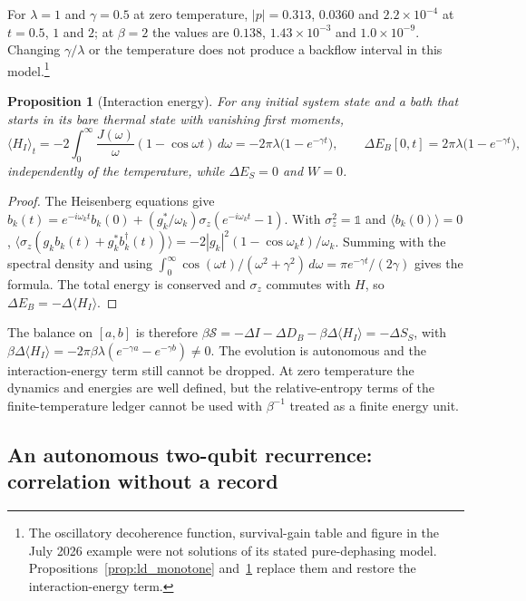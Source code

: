 \documentclass[12pt]{article}
\newtheorem{proposition}[theorem]{Proposition}
\begin{document}
For $\lambda=1$ and $\gamma=0.5$ at zero temperature, $|p|=0.313$, $0.0360$ and $2.2\times10^{-4}$ at $t=0.5$, $1$ and $2$; at $\beta=2$ the values are $0.138$, $1.43\times10^{-3}$ and $1.0\times10^{-9}$. Changing $\gamma/\lambda$ or the temperature does not produce a backflow interval in this model.\footnote{The oscillatory decoherence function, survival-gain table and figure in the July 2026 example were not solutions of its stated pure-dephasing model. Propositions~\ref{prop:ld_monotone} and~\ref{prop:ld_energy} replace them and restore the interaction-energy term.}

\begin{proposition}[Interaction energy]
\label{prop:ld_energy}
For any initial system state and a bath that starts in its bare thermal state with vanishing first moments,
\[
\langle H_I\rangle_t=-2\int_0^\infty\frac{J(\omega)}\omega(1-\cos\omega t)\,d\omega=-2\pi\lambda\bigl(1-e^{-\gamma t}\bigr),\qquad
\Delta E_B[0,t]=2\pi\lambda\bigl(1-e^{-\gamma t}\bigr),
\]
independently of the temperature, while $\Delta E_S=0$ and $W=0$.
\end{proposition}

\begin{proof}
The Heisenberg equations give $b_k(t)=e^{-i\omega_kt}b_k(0)+(g_k^*/\omega_k)\sigma_z(e^{-i\omega_kt}-1)$. With $\sigma_z^2=\mathbb 1$ and $\langle b_k(0)\rangle=0$, $\langle\sigma_z(g_kb_k(t)+g_k^*b_k^\dagger(t))\rangle=-2|g_k|^2(1-\cos\omega_kt)/\omega_k$. Summing with the spectral density and using $\int_0^\infty\cos(\omega t)/(\omega^2+\gamma^2)\,d\omega=\pi e^{-\gamma t}/(2\gamma)$ gives the formula. The total energy is conserved and $\sigma_z$ commutes with $H$, so $\Delta E_B=-\Delta\langle H_I\rangle$.
\end{proof}

The balance on $[a,b]$ is therefore $\beta\mathcal S=-\Delta I-\Delta D_B-\beta\Delta\langle H_I\rangle=-\Delta S_S$, with $\beta\Delta\langle H_I\rangle=-2\pi\beta\lambda(e^{-\gamma a}-e^{-\gamma b})\neq0$. The evolution is autonomous and the interaction-energy term still cannot be dropped. At zero temperature the dynamics and energies are well defined, but the relative-entropy terms of the finite-temperature ledger cannot be used with $\beta^{-1}$ treated as a finite energy unit.

\subsection{An autonomous two-qubit recurrence: correlation without a record}
\label{subsec:two_qubit}
\end{document}

